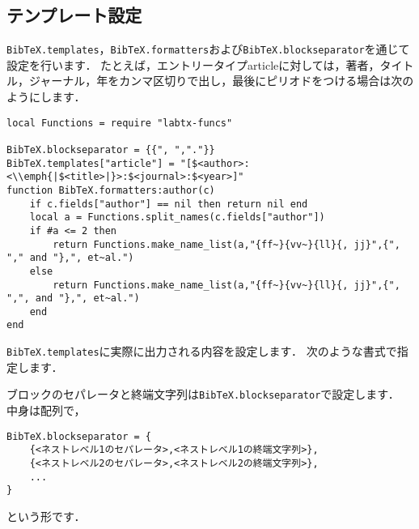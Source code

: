 \documentclass[a4paper]{ltjsarticle}
\newcommand*{\luavar}[1]{\texttt{#1}}
\begin{document}
\subsection{テンプレート設定}\label{subsec:テンプレート設定}
\luavar{BibTeX.templates}，\luavar{BibTeX.formatters}および\luavar{BibTeX.blockseparator}を通じて設定を行います．
たとえば，エントリータイプarticleに対しては，著者，タイトル，ジャーナル，年をカンマ区切りで出し，最後にピリオドをつける場合は次のようにします．
\begin{lstlisting}
local Functions = require "labtx-funcs"

BibTeX.blockseparator = {{", ","."}}
BibTeX.templates["article"] = "[$<author>:<\\emph{|$<title>|}>:$<journal>:$<year>]"
function BibTeX.formatters:author(c)
	if c.fields["author"] == nil then return nil end
	local a = Functions.split_names(c.fields["author"])
	if #a <= 2 then
		return Functions.make_name_list(a,"{ff~}{vv~}{ll}{, jj}",{", "," and "},", et~al.")
	else
		return Functions.make_name_list(a,"{ff~}{vv~}{ll}{, jj}",{", ",", and "},", et~al.")
	end
end
\end{lstlisting}
\luavar{BibTeX.templates}に実際に出力される内容を設定します．
次のような書式で指定します．

ブロックのセパレータと終端文字列は\luavar{BibTeX.blockseparator}で設定します．
中身は配列で，
\begin{lstlisting}
BibTeX.blockseparator = {
    {<ネストレベル1のセパレータ>,<ネストレベル1の終端文字列>},
    {<ネストレベル2のセパレータ>,<ネストレベル2の終端文字列>},
    ...
}
\end{lstlisting}
という形です．
\end{document}
